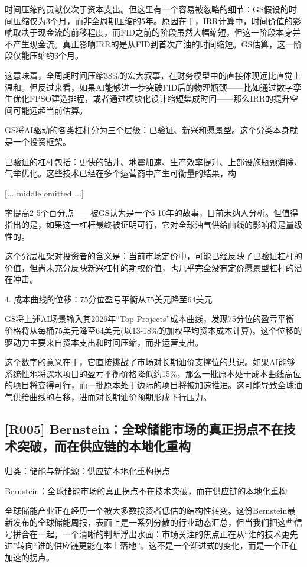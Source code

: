 \documentclass[11pt]{ctexart}
\begin{document}
时间压缩的贡献仅次于资本支出。但这里有一个容易被忽略的细节：GS假设的时间压缩仅为3个月，而非全周期压缩的5年。原因在于，IRR计算中，时间价值的影响取决于现金流的前移程度，而FID之前的阶段虽然大幅缩短，但这一阶段本身并不产生现金流。真正影响IRR的是从FID到首次产油的时间缩短。GS估算，这一阶段仅能压缩约3个月。

这意味着，全周期时间压缩38\%的宏大叙事，在财务模型中的直接体现远比直觉上温和。但反过来看，如果AI能够进一步突破FID后的物理瓶颈——比如通过数字孪生优化FPSO建造排程，或者通过模块化设计缩短集成时间——那么IRR的提升空间可能远超当前估算。

GS将AI驱动的各类杠杆分为三个层级：已验证、新兴和愿景型。这个分类本身就是一个投资框架。

已验证的杠杆包括：更快的钻井、地震加速、生产效率提升、上部设施瓶颈消除、气举优化。这些技术已经在多个运营商中产生可衡量的结果，构

[... middle omitted ...]

率提高2-5个百分点——被GS认为是一个5-10年的故事，目前未纳入分析。但值得指出的是，如果这一杠杆最终被证明可行，它对全球油气供给曲线的影响将是量级性的。

这个分层框架对投资者的含义是：当前市场定价中，可能已经反映了已验证杠杆的价值，但尚未充分反映新兴杠杆的期权价值，也几乎完全没有定价愿景型杠杆的潜在冲击。

4. 成本曲线的位移：75分位盈亏平衡从75美元降至64美元

GS将上述AI场景输入其2026年“Top Projects”成本曲线，发现75分位的盈亏平衡价格将从每桶75美元降至64美元(以13-18\%的加权平均资本成本计算)。这个位移的驱动力主要来自资本支出和时间压缩，而非运营支出。

这个数字的意义在于，它直接挑战了市场对长期油价支撑位的共识。如果AI能够系统性地将深水项目的盈亏平衡价格降低约15\%，那么一批原本处于成本曲线高位的项目将变得可行，而一批原本处于边际的项目将被加速推进。这可能导致全球油气供给曲线的右移，进而对长期油价预期形成下行压力。

\subsection{[R005] Bernstein：全球储能市场的真正拐点不在技术突破，而在供应链的本地化重构}
{\small\color{refgray}归类：储能与新能源：供应链本地化重构拐点}

Bernstein：全球储能市场的真正拐点不在技术突破，而在供应链的本地化重构

全球储能产业正在经历一个被大多数投资者低估的结构性转变。这份Bernstein最新发布的全球储能周报，表面上是一系列分散的行业动态汇总，但当我们把这些信号拼合在一起，一个清晰的判断浮出水面：市场关注的焦点正在从“谁的技术更先进”转向“谁的供应链更能在本土落地”。这不是一个渐进式的变化，而是一个正在加速的拐点。
\end{document}
